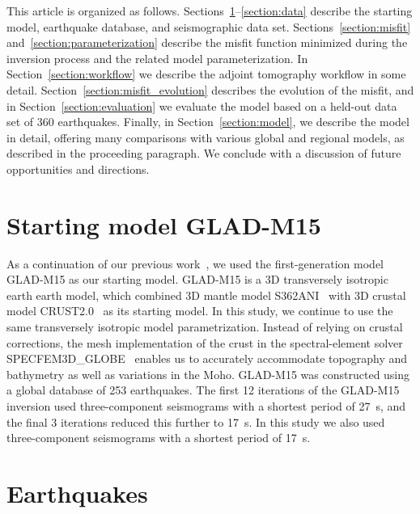 This article is organized as follows.
Sections~\ref{section:start}--\ref{section:data} describe the starting model,
earthquake database, and seismographic data set. 
Sections~\ref{section:misfit} and~\ref{section:parameterization} describe the misfit function minimized during the inversion process
and the related model parameterization.
In Section~\ref{section:workflow} we describe the adjoint tomography workflow in some detail.
Section~\ref{section:misfit_evolution} describes the evolution of the misfit, and in Section~\ref{section:evaluation} we evaluate the model based on a held-out data set of 360 earthquakes.
Finally, in Section~\ref{section:model}, we describe the model in detail,
offering many comparisons with various global and regional models, as described in the proceeding paragraph.
We conclude with a discussion of future opportunities and directions.

\section{Starting model GLAD-M15}
\label{section:start}

As a continuation of our previous work~\cite{bozdaug2016global},
we used the first-generation model GLAD-M15 as our
starting model.
GLAD-M15 is a 3D transversely isotropic earth earth model, which combined
3D mantle model S362ANI~\cite{kustowski2008anisotropic}
with 3D crustal model CRUST2.0~\cite{bassin2000current} as its starting model.
In this study,
we continue to use the same transversely isotropic model parametrization.
Instead of relying on crustal corrections,
the mesh implementation of the crust in the spectral-element solver SPECFEM3D\_GLOBE~\cite{KoTr02a,KoTr02b,PeKoLuMaLeCaLeMaLiBlNiBaTr11} enables us to accurately accommodate topography and bathymetry as well as variations in the Moho.
GLAD-M15 was constructed using a global database of 253 earthquakes.
The first 12 iterations of the GLAD-M15 inversion used three-component seismograms with a shortest period of 27~s,
and the final 3 iterations reduced this further to 17~s.
In this study we also used three-component seismograms with a shortest period of 17~s.

\section{Earthquakes}
\label{section:earthquakes}

